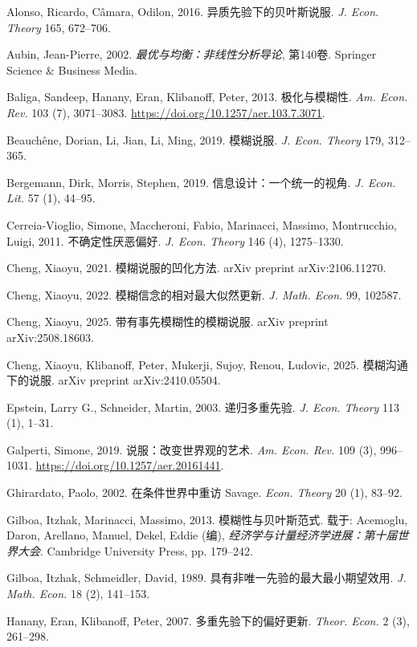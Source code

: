 \documentclass[12pt,a4paper]{article}
\theoremstyle{definition}
\theoremstyle{remark}
\newenvironment{translation}{%
    \par\smallskip\noindent%
    \begin{tcolorbox}[%
        colback=blue!3!white,%
        colframe=blue!40!black,%
        title=\textbf{中文翻译},%
        fonttitle=\small\bfseries,%
        left=0pt, right=0pt, top=2pt, bottom=2pt,%
        boxrule=0.5pt,%
        arc=0pt,%
        outer arc=0pt%
    ]%
    \small\color{blue!60!black}%
}{%
    \end{tcolorbox}\medskip%
}
\begin{document}
\begin{translation}
\noindent Alonso, Ricardo, C\^{a}mara, Odilon, 2016. 异质先验下的贝叶斯说服. \textit{J. Econ. Theory} 165, 672--706.

\noindent Aubin, Jean-Pierre, 2002. \textit{最优与均衡：非线性分析导论}, 第140卷. Springer Science \& Business Media.

\noindent Baliga, Sandeep, Hanany, Eran, Klibanoff, Peter, 2013. 极化与模糊性. \textit{Am. Econ. Rev.} 103 (7), 3071--3083. \url{https://doi.org/10.1257/aer.103.7.3071}.

\noindent Beauch\^{e}ne, Dorian, Li, Jian, Li, Ming, 2019. 模糊说服. \textit{J. Econ. Theory} 179, 312--365.

\noindent Bergemann, Dirk, Morris, Stephen, 2019. 信息设计：一个统一的视角. \textit{J. Econ. Lit.} 57 (1), 44--95.

\noindent Cerreia-Vioglio, Simone, Maccheroni, Fabio, Marinacci, Massimo, Montrucchio, Luigi, 2011. 不确定性厌恶偏好. \textit{J. Econ. Theory} 146 (4), 1275--1330.

\noindent Cheng, Xiaoyu, 2021. 模糊说服的凹化方法. arXiv preprint arXiv:2106.11270.

\noindent Cheng, Xiaoyu, 2022. 模糊信念的相对最大似然更新. \textit{J. Math. Econ.} 99, 102587.

\noindent Cheng, Xiaoyu, 2025. 带有事先模糊性的模糊说服. arXiv preprint arXiv:2508.18603.

\noindent Cheng, Xiaoyu, Klibanoff, Peter, Mukerji, Sujoy, Renou, Ludovic, 2025. 模糊沟通下的说服. arXiv preprint arXiv:2410.05504.

\noindent Epstein, Larry G., Schneider, Martin, 2003. 递归多重先验. \textit{J. Econ. Theory} 113 (1), 1--31.

\noindent Galperti, Simone, 2019. 说服：改变世界观的艺术. \textit{Am. Econ. Rev.} 109 (3), 996--1031. \url{https://doi.org/10.1257/aer.20161441}.

\noindent Ghirardato, Paolo, 2002. 在条件世界中重访 Savage. \textit{Econ. Theory} 20 (1), 83--92.

\noindent Gilboa, Itzhak, Marinacci, Massimo, 2013. 模糊性与贝叶斯范式. 载于: Acemoglu, Daron, Arellano, Manuel, Dekel, Eddie (编), \textit{经济学与计量经济学进展：第十届世界大会}. Cambridge University Press, pp. 179--242.

\noindent Gilboa, Itzhak, Schmeidler, David, 1989. 具有非唯一先验的最大最小期望效用. \textit{J. Math. Econ.} 18 (2), 141--153.

\noindent Hanany, Eran, Klibanoff, Peter, 2007. 多重先验下的偏好更新. \textit{Theor. Econ.} 2 (3), 261--298.


\end{translation}
\end{document}
